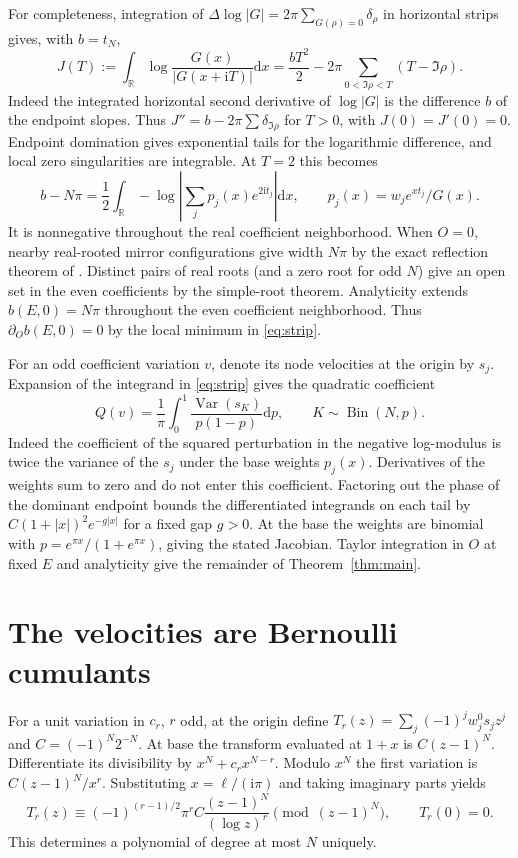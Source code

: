 \documentclass[11pt]{article}
\newcommand{\ii}{\mathrm i}
\newcommand{\dd}{\mathrm d}
\newcommand{\Var}{\operatorname{Var}}
\begin{document}
For completeness, integration of
$\Delta\log |G|=2\pi\sum_{G(\rho)=0}\delta_\rho$
in horizontal strips gives, with $b=t_N$,
\[
 J(T):=\int_{\mathbb R}\log\frac{G(x)}{|G(x+\ii T)|}\dd x
 =\frac{bT^2}{2}-2\pi\sum_{0<\Im\rho<T}(T-\Im\rho).
\]
Indeed the integrated horizontal second derivative of $\log|G|$
is the difference $b$ of the endpoint slopes. Thus
$J''=b-2\pi\sum\delta_{\Im\rho}$ for $T>0$, with
$J(0)=J'(0)=0$. Endpoint domination gives exponential tails for the
logarithmic difference, and local zero singularities are integrable.
At $T=2$ this becomes
\begin{equation}\label{eq:strip}
 b-N\pi=\frac12\int_{\mathbb R}
 -\log\left|\sum_j p_j(x)e^{2\ii t_j}\right|\dd x,
 \qquad p_j(x)=w_je^{xt_j}/G(x).
\end{equation}
It is nonnegative throughout the real coefficient neighborhood.
When $O=0$, nearby real-rooted mirror configurations give width
$N\pi$ by the exact reflection theorem of \cite{repo}. Distinct pairs
of real roots (and a zero root for odd $N$) give an open set in the
even coefficients by the simple-root theorem. Analyticity extends
$b(E,0)=N\pi$ throughout the even coefficient neighborhood. Thus
$\partial_O b(E,0)=0$ by the local minimum in \eqref{eq:strip}.

For an odd coefficient variation $v$, denote its node velocities
at the origin by $s_j$. Expansion of the integrand in \eqref{eq:strip}
gives the quadratic coefficient
\begin{equation}\label{eq:variance}
 Q(v)=\frac1\pi\int_0^1\frac{\Var(s_K)}{p(1-p)}\dd p,
 \qquad K\sim\operatorname{Bin}(N,p).
\end{equation}
Indeed the coefficient of the squared perturbation in the negative
log-modulus is twice the variance of the $s_j$ under the base weights
$p_j(x)$. Derivatives of the weights sum to zero and do not enter
this coefficient. Factoring out the phase of the dominant endpoint
bounds the differentiated integrands on each tail by
$C(1+|x|)^2 e^{-g|x|}$ for a fixed gap $g>0$. At the base the weights
are binomial with $p=e^{\pi x}/(1+e^{\pi x})$, giving the stated
Jacobian. Taylor integration in $O$ at fixed $E$ and analyticity
give the remainder of Theorem~\ref{thm:main}.

\section{The velocities are Bernoulli cumulants}
For a unit variation in $c_r$, $r$ odd, at the origin define
$T_r(z)=\sum_j(-1)^jw_j^0s_j z^j$ and $C=(-1)^N2^{-N}$.
At base the transform evaluated at $1+x$ is $C(z-1)^N$.
Differentiate its divisibility by $x^N+c_r x^{N-r}$. Modulo $x^N$
the first variation is $C(z-1)^N/x^r$. Substituting
$x=\ell/(\ii\pi)$ and taking imaginary parts yields
\begin{equation}\label{eq:rem}
 T_r(z)\equiv (-1)^{(r-1)/2}\pi^r C\frac{(z-1)^N}{(\log z)^r}
               \pmod{(z-1)^N},\qquad T_r(0)=0 .
\end{equation}
This determines a polynomial of degree at most $N$ uniquely.
\end{document}
